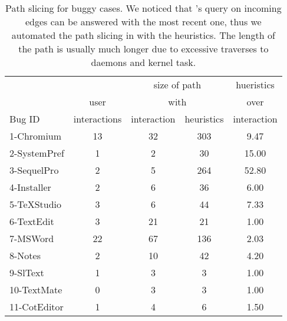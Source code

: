 \begin{table}[ht]
\footnotesize
\centering
  \begin{tabularx}{\columnwidth}{l|cccc}
  \hline
 	   &       &\multicolumn{2}{c}{size of path}& hueristics\\
       & user  & \multicolumn{2}{c}{with}  & over \\
Bug ID & interactions & interaction & heuristics  & interaction\\
\hline
\hline
1-Chromium  & 13 & 32 & 303 & 9.47\\
2-SystemPref & 1 & 2 & 30 & 15.00\\
3-SequelPro  & 2 & 5 & 264 & 52.80\\
4-Installer  & 2 & 6 & 36  & 6.00\\
5-TeXStudio  & 3 & 6 & 44  & 7.33\\
6-TextEdit  & 3 & 21 & 21 & 1.00\\
7-MSWord  & 22 & 67 & 136 & 2.03\\
8-Notes  & 2 & 10 & 42 & 4.20\\
9-SlText  & 1 & 3 & 3 & 1.00\\
10-TextMate  & 0 & 3 & 3 & 1.00\\
11-CotEditor  & 1 & 4 & 6 & 1.50\\
\hline
  \end{tabularx}
  \parbox{\columnwidth}
  {\caption{Path slicing for buggy cases. 
	We noticed that \xxx's query on incoming edges can be answered with the most
	recent one, thus we automated the path slicing in \xxx with the heuristics.
	The length of the path is usually much longer due to excessive traverses to
	daemons and kernel task.}
  \label{table:results}
  }
\end{table}


